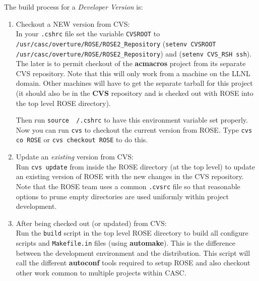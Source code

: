 The build process for a {\em Developer Version} is:
\begin{enumerate}
     \item Checkout a NEW version from CVS: \\
     In your {\tt .cshrc} file set the variable {\tt CVSROOT} to 
     {\tt /usr/casc/overture/ROSE/ROSE2\_Repository}
     ({\tt setenv CVSROOT /usr/casc/overture/ROSE/ROSE2\_Repository})
     and ({\tt setenv CVS\_RSH ssh}).
     The later is to permit checkout of the {\bf acmacros} project from its separate 
     CVS repository.  Note that this will only work from a machine on the LLNL domain.
     Other machines will have to get the separate tarball for this project (it should
     also be in the {\bf CVS} repository and is checked out with ROSE into the top 
     level ROSE directory).

     Then run {\tt source ~/.cshrc} to have this environment variable set properly.
     Now you can run {\tt cvs} to checkout the current version from ROSE. Type
     {\tt cvs co ROSE} or {\tt cvs checkout ROSE} to do this.

     \item  Update an {\em existing} version from CVS: \\
     Run {\tt cvs update} from inside the ROSE directory (at the top level) to update
     an existing version of ROSE with the new changes in the CVS repository.
     Note that the ROSE team uses a common {\tt .cvsrc} file so that reasonable options
     to prune empty directories are used uniformly within project development.

     \item After being checked out (or updated) from CVS: \\
     Run the {\tt build} script in the top level ROSE directory to build all configure scripts
     and {\tt Makefile.in} files (using {\bf automake}).  This is the difference between the development
     environment and the distribution. This script will call the different {\bf autoconf}
     tools required to setup ROSE and also checkout other work common to multiple projects
     within CASC.


\end{enumerate}
